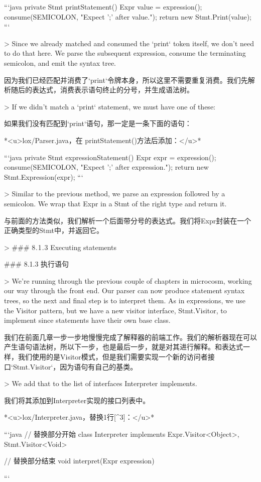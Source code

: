 \documentclass[cn,11pt,chinese]{elegantbook}
\begin{document}
{{```java
  private Stmt printStatement() {
    Expr value = expression();
    consume(SEMICOLON, "Expect ';' after value.");
    return new Stmt.Print(value);
  }
```

> Since we already matched and consumed the `print` token itself, we don’t need to do that here. We parse the subsequent expression, consume the terminating semicolon, and emit the syntax tree.

因为我们已经匹配并消费了`print`令牌本身，所以这里不需要重复消费。我们先解析随后的表达式，消费表示语句终止的分号，并生成语法树。

> If we didn’t match a `print` statement, we must have one of these:

如果我们没有匹配到`print`语句，那一定是一条下面的语句：

*<u>lox/Parser.java，在 printStatement()方法后添加：</u>*

```java
  private Stmt expressionStatement() {
    Expr expr = expression();
    consume(SEMICOLON, "Expect ';' after expression.");
    return new Stmt.Expression(expr);
  }
```

> Similar to the previous method, we parse an expression followed by a semicolon. We wrap that Expr in a Stmt of the right type and return it.

与前面的方法类似，我们解析一个后面带分号的表达式。我们将Expr封装在一个正确类型的Stmt中，并返回它。

> ### 8 . 1 . 3 Executing statements

### 8.1.3 执行语句

> We’re running through the previous couple of chapters in microcosm, working our way through the front end. Our parser can now produce statement syntax trees, so the next and final step is to interpret them. As in expressions, we use the Visitor pattern, but we have a new visitor interface, Stmt.Visitor, to implement since statements have their own base class.

我们在前面几章一步一步地慢慢完成了解释器的前端工作。我们的解析器现在可以产生语句语法树，所以下一步，也是最后一步，就是对其进行解释。和表达式一样，我们使用的是Visitor模式，但是我们需要实现一个新的访问者接口`Stmt.Visitor`，因为语句有自己的基类。

> We add that to the list of interfaces Interpreter implements.

我们将其添加到Interpreter实现的接口列表中。

*<u>lox/Interpreter.java，替换1行[^3]：</u>*

```java
// 替换部分开始
class Interpreter implements Expr.Visitor<Object>,
                             Stmt.Visitor<Void> {
// 替换部分结束
  void interpret(Expr expression) { 
```

}}}}
\end{document}
